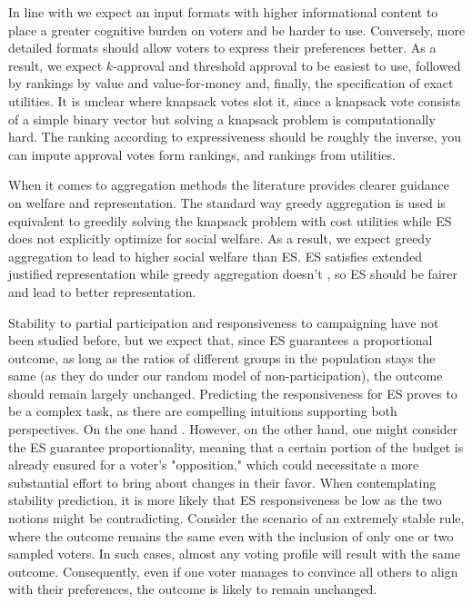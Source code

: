 \documentclass[mnsc,blindrev]{informs3_freeuse} %
\newcommand{\kibitz}[2]{\ifnum\Comments=1{\color{#1}{#2}}\fi}
\newcommand{\rf}[1]{\kibitz{blue}{[Roy says:#1]}}
\newcommand{\gb}[1]{\kibitz{red}{[GB:#1]}}
\newcommand{\mes}{ES}
\begin{document}
In line with \citep{MPSW19,benade2021preference} we expect an input formats with higher informational content to place a greater cognitive burden on voters and be harder to use. %
Conversely,   more detailed formats should allow voters to express their preferences better. As a result, we expect $k$-approval and threshold approval to be easiest to use, followed by rankings by value and value-for-money and, finally, the specification of exact utilities. It is unclear where knapsack votes slot it, since a knapsack vote consists of a simple binary vector but solving a knapsack problem is computationally hard. The ranking according to expressiveness should be roughly the inverse, you can impute approval votes form rankings, and rankings from utilities. 

When it comes to aggregation methods the literature provides clearer guidance on welfare and representation. The standard way greedy aggregation is used is equivalent to greedily solving the knapsack problem with cost utilities while \mes{} does not  explicitly optimize for social welfare. As a result,  we expect greedy aggregation to lead to higher social welfare than  \mes. \mes{} satisfies extended justified representation while greedy aggregation doesn't \citep{PS20}, so \mes{} should be fairer and lead to better representation.

Stability to partial participation and responsiveness to campaigning have not been studied before, but we expect that, since \mes{} guarantees a proportional outcome,   as long as the ratios of different groups in the population stays the same (as they do under our random model of non-participation), the outcome should remain largely unchanged. 
Predicting the responsiveness for \mes{} proves to be a complex task, as there are compelling intuitions supporting both perspectives. On the one hand \rf{Please continue the sentece}. However, on the other hand, one might consider the \mes{} guarantee proportionality, meaning that a certain portion of the budget is already ensured for a voter's "opposition," which could necessitate a more substantial effort to bring about changes in their favor.
When contemplating stability prediction, it is more likely that \mes{} responsiveness be low as the two notions might be contradicting. Consider the scenario of an extremely stable rule, where the outcome remains the same even with the inclusion of only one or two sampled voters. In such cases, almost any voting profile will result with the same outcome. Consequently, even if one voter manages to convince all others to align with their preferences, the outcome is likely to remain unchanged.
\end{document}
